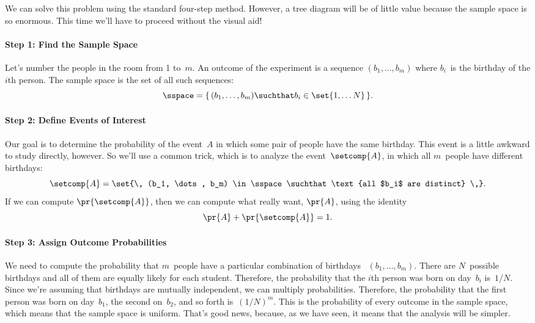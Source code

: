 We can solve this problem using the standard four-step method.
However, a tree diagram will be of little value because the sample
space is so enormous.  This time we'll have to proceed without the
visual aid!

\paragraph{Step 1: Find the Sample Space}

Let's number the people in the room from 1 to~$m$.  An outcome of the
experiment is a sequence $(b_1, \dots, b_m)$ where $b_i$~is the
birthday of the $i$th person.  The sample space is the set of all such
sequences:
\begin{equation*}
    \sspace = \{\, (b_1, \dots, b_m) \suchthat b_i \in \set{1, \dots
      N} \,\}.
\end{equation*}

\paragraph{Step 2: Define Events of Interest}

Our goal is to determine the probability of the event~$A$ in which
some pair of people have the same birthday.  This event is a little
awkward to study directly, however.  So we'll use a common trick,
which is to analyze the  event~$\setcomp{A}$, in
which all $m$~people have different birthdays:
\begin{equation*}
    \setcomp{A} = \set{\, (b_1, \dots, b_m) \in \sspace
                    \suchthat \text{all $b_i$ are distinct} \,}.
\end{equation*}
If we can compute $\pr{\setcomp{A}}$, then we can compute what
really want, $\pr{A}$, using the identity
\begin{equation*}
    \pr{A} + \pr{\setcomp{A}} = 1.
\end{equation*}

\paragraph{Step 3: Assign Outcome Probabilities}

We need to compute the probability that $m$~people have a particular
combination of birthdays ~$(b_1, \dots, b_m)$.  There are $N$~possible
birthdays and all of them are equally likely for each student.
Therefore, the probability that the $i$th person was born on day~$b_i$
is~$1/N$.  Since we're assuming that birthdays are mutually
independent, we can multiply probabilities.  Therefore, the
probability that the first person was born on day~$b_1$, the second
on~$b_2$, and so forth is~$(1/N)^m$.  This is the probability of every
outcome in the sample space, which means that the sample space is
uniform.  That's good news, because, as we have seen, it means that
the analysis will be simpler.

